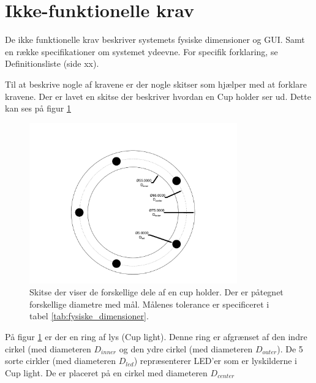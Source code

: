 \documentclass[Kravspecifikation/Kravspec_Main.tex]{subfiles}
\begin{document}
\section{Ikke-funktionelle krav}
De ikke funktionelle krav beskriver systemets fysiske dimensioner og GUI. Samt en række specifikationer om systemet ydeevne. For specifik forklaring, se Definitionsliste (side xx).

Til at beskrive nogle af kravene er der nogle skitser som hjælper med at forklare kravene. Der er lavet en skitse der beskriver hvordan en Cup holder ser ud. Dette kan ses på figur \ref{fig:LEDplacement}

\begin{figure}[H]
    \centering
    \includegraphics[width=0.8\textwidth,trim={2in 0.4in 2in 1.3in},clip, page=1]{Kravspecifikation/Ikke-funktionelle/graphics/LEDplacement.pdf}
    \caption{Skitse der viser de forskellige dele af en cup holder. Der er påtegnet forskellige diametre med mål. Målenes tolerance er specificeret i tabel \ref{tab:fysiske_dimensioner}.}
    \label{fig:LEDplacement}
\end{figure}

På figur \ref{fig:LEDplacement} er der en ring af lys (Cup light). Denne ring er afgrænset af den indre cirkel (med diameteren $D_{inner}$ og den ydre cirkel (med diameteren $D_{outer}$). De 5 sorte cirkler (med diameteren $D_{led}$) repræsenterer LED'er som er lyskilderne i Cup light. De er placeret på en cirkel med diameteren $D_{center}$
\end{document}
